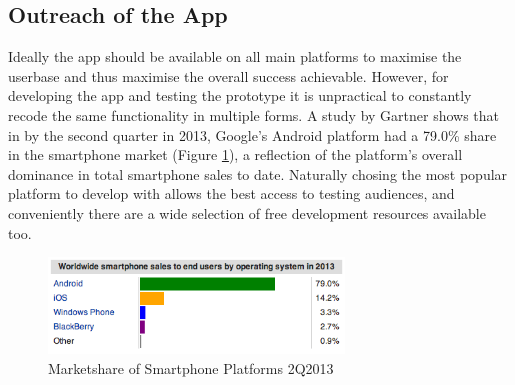 \subsection{Outreach of the App}
Ideally the app should be available on all main platforms to maximise the userbase and thus maximise the overall success achievable. However, for developing the app and testing the prototype it is unpractical to constantly recode the same functionality in multiple forms. A study by Gartner shows that in by the second quarter in 2013, Google's Android platform had a 79.0\% share in the smartphone market (Figure \ref{fig:marketshareAndroid})\cite{gartner2013marketshare}, a reflection of the platform's overall dominance in total smartphone sales to date. Naturally chosing the most popular platform to develop with allows the best access to testing audiences, and conveniently there are a wide selection of free development resources available too.
\begin{figure}[ht!]
		\centering
			\includegraphics[width=0.7\textwidth]{drawings/Gartner_marketshare.png}
		\caption{Marketshare of Smartphone Platforms 2Q2013 ~\cite{gartner2013marketshare}}
		\label{fig:marketshareAndroid}
	\end{figure}